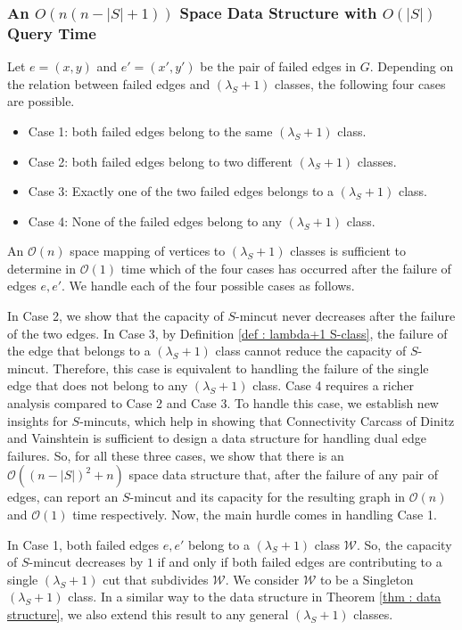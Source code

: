 \documentclass[letterpaper,11pt]{article}
\begin{document}
\subsubsection{An $O(n(n-|S|+1))$ Space Data Structure with $O(|S|)$ Query Time} \label{sec : overview : dual edge first}
Let $e=(x,y)$ and $e'=(x',y')$ be the pair of failed edges in $G$. Depending on the relation between failed edges and $(\lambda_S+1)$ classes, the following four cases are possible.
\begin{itemize}
    \item Case 1: both failed edges belong to the same $(\lambda_S+1)$ class.
    \item Case 2: both failed edges belong to two different $(\lambda_S+1)$ classes.
    \item Case 3: Exactly one of the two failed edges belongs to a $(\lambda_S+1)$ class.
    \item Case 4: None of the failed edges belong to any $(\lambda_S+1)$ class.
\end{itemize}
An ${\mathcal O}(n)$ space mapping of vertices to $(\lambda_S+1)$ classes is sufficient to determine in ${\mathcal O}(1)$ time which of the four cases has occurred after the failure of edges $e,e'$. We handle each of the four possible cases as follows.

In Case 2, we show that the capacity of $S$-mincut never decreases after the failure of the two edges. In Case 3, by Definition \ref{def : lambda+1 S-class}, 
the failure of the edge that belongs to a $(\lambda_S+1)$ class cannot reduce the capacity of $S$-mincut. Therefore, this case is equivalent to handling the failure of the single edge that does not belong to any $(\lambda_S+1)$ class. Case 4 requires a richer analysis compared to Case 2 and Case 3. To handle this case, we establish new insights for $S$-mincuts, which help in showing that Connectivity Carcass of Dinitz and Vainshtein \cite{DBLP:conf/stoc/DinitzV94, DBLP:conf/soda/DinitzV95, DBLP:journals/siamcomp/DinitzV00}
is sufficient to design a data structure for handling dual edge failures. So, for all these three cases, we show that there is an ${\mathcal O}((n-|S|)^2+n)$ space data structure that, after the failure of any pair of edges,
can report an $S$-mincut and its capacity for the resulting graph in ${\mathcal O}(n)$ and ${\mathcal O}(1)$ time respectively. 
Now, the main hurdle comes in handling Case 1. 

In Case 1, both failed edges $e,e'$ belong to a $(\lambda_S+1)$ class ${\mathcal W}$. So, the capacity of $S$-mincut decreases by $1$ if and only if both failed edges are contributing to a single $(\lambda_S+1)$ cut that subdivides ${\mathcal W}$. We consider ${\mathcal W}$ to be a Singleton $(\lambda_S+1)$ class. In a similar way to the data structure in Theorem \ref{thm : data structure}, we also extend this result to any general $(\lambda_S+1)$ classes.\\
\end{document}
